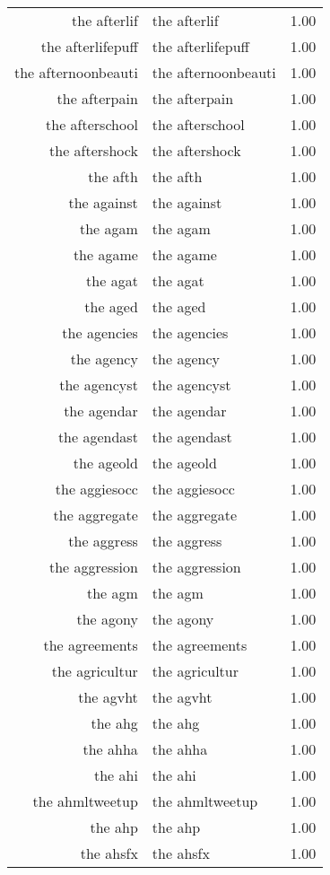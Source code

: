\begin{table}[ht]
\begin{tabular}{rlr}
  the afterlif & the afterlif & 1.00 \\ 
  the afterlifepuff & the afterlifepuff & 1.00 \\ 
  the afternoonbeauti & the afternoonbeauti & 1.00 \\ 
  the afterpain & the afterpain & 1.00 \\ 
  the afterschool & the afterschool & 1.00 \\ 
  the aftershock & the aftershock & 1.00 \\ 
  the afth & the afth & 1.00 \\ 
  the against & the against & 1.00 \\ 
  the agam & the agam & 1.00 \\ 
  the agame & the agame & 1.00 \\ 
  the agat & the agat & 1.00 \\ 
  the aged & the aged & 1.00 \\ 
  the agencies & the agencies & 1.00 \\ 
  the agency & the agency & 1.00 \\ 
  the agencyst & the agencyst & 1.00 \\ 
  the agendar & the agendar & 1.00 \\ 
  the agendast & the agendast & 1.00 \\ 
  the ageold & the ageold & 1.00 \\ 
  the aggiesocc & the aggiesocc & 1.00 \\ 
  the aggregate & the aggregate & 1.00 \\ 
  the aggress & the aggress & 1.00 \\ 
  the aggression & the aggression & 1.00 \\ 
  the agm & the agm & 1.00 \\ 
  the agony & the agony & 1.00 \\ 
  the agreements & the agreements & 1.00 \\ 
  the agricultur & the agricultur & 1.00 \\ 
  the agvht & the agvht & 1.00 \\ 
  the ahg & the ahg & 1.00 \\ 
  the ahha & the ahha & 1.00 \\ 
  the ahi & the ahi & 1.00 \\ 
  the ahmltweetup & the ahmltweetup & 1.00 \\ 
  the ahp & the ahp & 1.00 \\ 
  the ahsfx & the ahsfx & 1.00 \\ 

\end{tabular}
\end{table}
